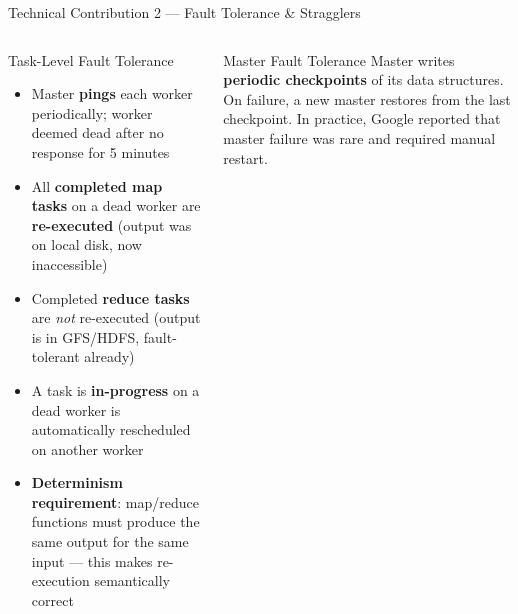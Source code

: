 \documentclass[aspectratio=169,10pt]{beamer}
\begin{document}
\begin{frame}{Technical Contribution 2 — Fault Tolerance \& Stragglers}
  \begin{columns}[T]
      \begin{block}{Task-Level Fault Tolerance}
        \begin{itemize}
          \item Master \textbf{pings} each worker periodically;
                worker deemed dead after no response for 5 minutes
          \item All \textbf{completed map tasks} on a dead worker are
                \textbf{re-executed} (output was on local disk, now inaccessible)
          \item Completed \textbf{reduce tasks} are \emph{not} re-executed
                (output is in GFS/HDFS, fault-tolerant already)
          \item A task is \textbf{in-progress} on a dead worker is
                automatically rescheduled on another worker
          \item \textbf{Determinism requirement}: map/reduce functions
                must produce the same output for the same input
                — this makes re-execution semantically correct
        \end{itemize}
      \end{block}
      \vspace{4pt}
      \begin{exampleblock}{Master Fault Tolerance}
        Master writes \textbf{periodic checkpoints} of its data
        structures.  On failure, a new master restores from the
        last checkpoint.  In practice, Google reported that master
        failure was rare and required manual restart.
      \end{exampleblock}


\end{columns}
\end{frame}
\end{document}
